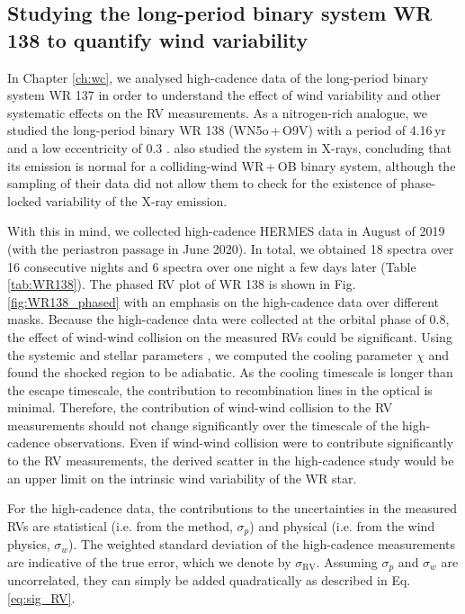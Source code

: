 \subsection{Studying the long-period binary system WR 138 to quantify wind variability} \label{sect:windVariability}

In Chapter \ref{ch:wc}, we analysed high-cadence data of the long-period binary system WR 137 in order to understand the effect of wind variability and other systematic effects on the RV measurements. As a nitrogen-rich analogue, we studied the long-period binary WR 138 (WN5o\,+\,O9V) with a period of 4.16\,yr and a low eccentricity of 0.3 \citep{2013Palate,1990Annuk,2016Richardson}. \citet{2013Palate} also studied the system in X-rays, concluding that its emission is normal for a colliding-wind WR\,+\,OB binary system, although the sampling of their data did not allow them to check for the existence of phase-locked variability of the X-ray emission.

With this in mind, we collected high-cadence HERMES data in August of 2019 (with the periastron passage in June 2020). In total, we obtained 18 spectra over 16 consecutive nights and 6 spectra over one night a few days later (Table \ref{tab:WR138}). The phased RV plot of WR 138 is shown in Fig. \ref{fig:WR138_phased} with an emphasis on the high-cadence data over different masks. Because the high-cadence data were collected at the orbital phase of 0.8, the effect of wind-wind collision \citep[e.g.][]{2002Luehrs} on the measured RVs could be significant. Using the systemic and stellar parameters \citep{1990Annuk,2016Richardson}, we computed the cooling parameter $\chi$ \citep{1992Stevens} and found the shocked region to be adiabatic. As the cooling timescale is longer than the escape timescale, the contribution to recombination lines in the optical is minimal. Therefore, the contribution of wind-wind collision to the RV measurements should not change significantly over the timescale of the high-cadence observations. Even if wind-wind collision were to contribute significantly to the RV measurements, the derived scatter in the high-cadence study would be an upper limit on the intrinsic wind variability of the WR star.


For the high-cadence data, the contributions to the uncertainties in the measured RVs are statistical (i.e. from the method, $\sigma_p$) and physical (i.e. from the wind physics, $\sigma_w$). The weighted standard deviation of the high-cadence measurements are indicative of the true error, which we denote by $\sigma_{\textrm{RV}}$. Assuming $\sigma_p$ and $\sigma_w$ are uncorrelated, they can simply be added quadratically as described in Eq. \ref{eq:sig_RV}.

